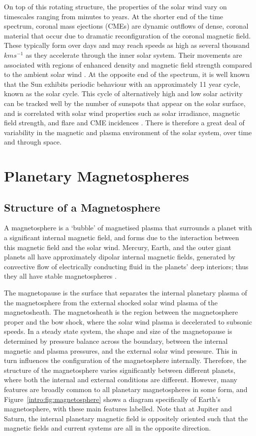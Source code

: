 On top of this rotating structure, the properties of the solar wind vary on timescales ranging from minutes to years. At the shorter end of the time spectrum, coronal mass ejections (CMEs) are dynamic outflows of dense, coronal material that occur due to dramatic reconfiguration of the coronal magnetic field. These typically form over days and may reach speeds as high as several thousand $\si{km s^{-1}}$ as they accelerate through the inner solar system. Their movements are associated with regions of enhanced density and magnetic field strength compared to the ambient solar wind \citep{odstrcil1999}. At the opposite end of the spectrum, it is well known that the Sun exhibits periodic behaviour with an approximately 11 year cycle, known as the solar cycle. This cycle of alternatively high and low solar activity can be tracked well by the number of sunspots that appear on the solar surface, and is correlated with solar wind properties such as solar irradiance, magnetic field strength, and flare and CME incidences \citep{hathaway2015}. There is therefore a great deal of variability in the magnetic and plasma environment of the solar system, over time and through space.

\section{Planetary Magnetospheres}
\subsection{Structure of a Magnetosphere}
A magnetosphere is a `bubble' of magnetised plasma that surrounds a planet with a significant internal magnetic field, and forms due to the interaction between this magnetic field and the solar wind. Mercury, Earth, and the outer giant planets all have approximately dipolar internal magnetic fields, generated by convective flow of electrically conducting fluid in the planets' deep interiors; thus they all have stable magnetospheres \citep{kivelson2014book}.

The magnetopause is the surface that separates the internal planetary plasma of the magnetosphere from the external shocked solar wind plasma of the magnetosheath. The magnetosheath is the region between the magnetosphere proper and the bow shock, where the solar wind plasma is decelerated to subsonic speeds. In a steady state system, the shape and size of the magnetopause is determined by pressure balance across the boundary, between the internal magnetic and plasma pressures, and the external solar wind pressure. This in turn influences the configuration of the magnetosphere internally. Therefore, the structure of the magnetosphere varies significantly between different planets, where both the internal and external conditions are different. However, many features are broadly common to all planetary magnetospheres in some form, and Figure~\ref{intro:fig:magnetosphere} shows a diagram specifically of Earth's magnetosphere, with these main features labelled. Note that at Jupiter and Saturn, the internal planetary magnetic field is oppositely oriented such that the magnetic fields and current systems are all in the opposite direction.

